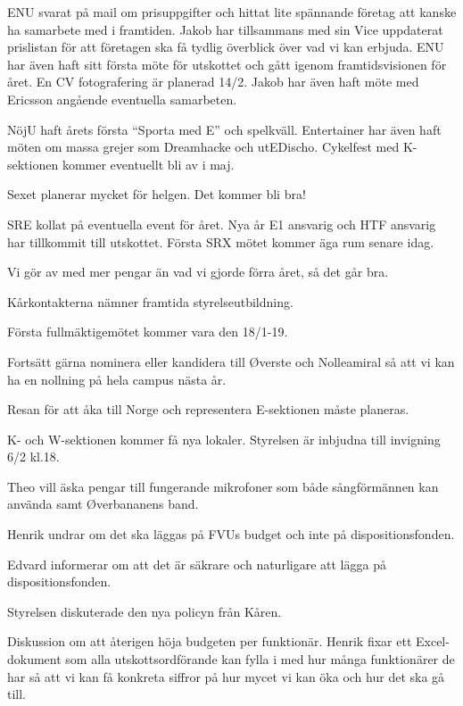 \documentclass[10pt]{article}
\begin{document}
\begin{paragrafer}
\begin{paragrafer}
ENU svarat på mail om prisuppgifter och hittat lite spännande företag att kanske ha samarbete med i framtiden. Jakob har tillsammans med sin Vice uppdaterat prislistan för att företagen ska få tydlig överblick över vad vi kan erbjuda. ENU har även haft  sitt första möte för utskottet och gått igenom framtidsvisionen för året. En CV fotografering är planerad 14/2. Jakob har även haft möte med Ericsson angående eventuella samarbeten. 

NöjU haft årets första ``Sporta med E'' och spelkväll. Entertainer har även haft möten om massa grejer som Dreamhacke och utEDischo. Cykelfest med K-sektionen kommer eventuellt bli av i maj.

Sexet planerar mycket för helgen. Det kommer bli bra! 

SRE kollat på eventuella event för året. Nya år E1 ansvarig och HTF ansvarig har tillkommit till utskottet. Första SRX mötet kommer äga rum senare idag.



Vi gör av med mer pengar än vad vi gjorde förra året, så det går bra.

Kårkontakterna nämner framtida styrelseutbildning. 

Första fullmäktigemötet kommer vara den 18/1-19. 

Fortsätt gärna nominera eller kandidera till Øverste och Nolleamiral så att vi kan ha en nollning på hela campus nästa år.

Resan för att åka till Norge och representera E-sektionen måste planeras.

K- och W-sektionen kommer få nya lokaler. Styrelsen är inbjudna till invigning 6/2 kl.18.
\end{paragrafer}

Theo vill äska pengar till fungerande mikrofoner som både sångförmännen kan använda samt Øverbananens band.

Henrik undrar om det ska läggas på FVUs budget och inte på dispositionsfonden.

Edvard informerar om att det är säkrare och naturligare att lägga på dispositionsfonden.

\Mbaby

Styrelsen diskuterade den nya policyn från Kåren.

Diskussion om att återigen höja budgeten per funktionär. 
Henrik fixar ett Excel-dokument som alla utskottsordförande kan fylla i med hur många funktionärer de har så att vi kan få konkreta siffror på hur mycet vi kan öka och hur det ska gå till.


\end{paragrafer}
\end{document}

